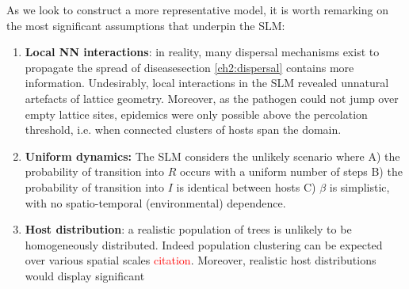 As we look to construct a more representative model, it is worth remarking on the most significant assumptions that underpin the SLM:
\begin{enumerate}
    \item \textbf{Local NN interactions}: in reality, many dispersal mechanisms exist to propagate the spread of disease\textemdash section \ref{ch2:dispersal} contains more information. Undesirably, local interactions in the SLM revealed unnatural artefacts of lattice geometry.
    Moreover, as the pathogen could not jump over empty lattice sites, epidemics were only possible above the percolation threshold, i.e. when connected clusters of hosts span the domain.  
    \item \textbf{Uniform dynamics:} The SLM considers the unlikely scenario where A) the probability of transition into $R$ occurs with a uniform number of steps B) the probability of transition into $I$ is identical between hosts C) $\beta$ is simplistic, with no spatio-temporal (environmental) dependence.
 \item \textbf{Host distribution}: a realistic population of trees is unlikely to be homogeneously distributed. Indeed population clustering can be expected over various spatial scales \textcolor{red}{citation}. Moreover, realistic host distributions would display significant 
\end{enumerate}




\newpage
